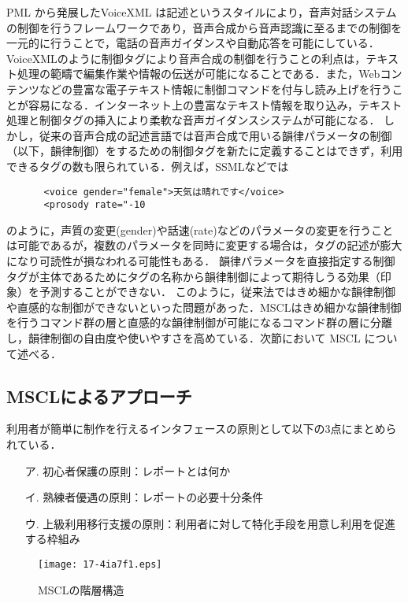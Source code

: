 \documentclass[japanese]{jnlp_1.4}
\begin{document}
PML \cite{Ramming}から発展したVoiceXML \citeauthor{VoiceXML}は記述というスタイルにより，音声対話システムの制御を行うフレームワークであり，音声合成から音声認識に至るまでの制御を一元的に行うことで，電話の音声ガイダンスや自動応答を可能にしている．VoiceXMLのように制御タグにより音声合成の制御を行うことの利点は，テキスト処理の範疇で編集作業や情報の伝送が可能になることである．また，Webコンテンツなどの豊富な電子テキスト情報に制御コマンドを付与し読み上げを行うことが容易になる．インターネット上の豊富なテキスト情報を取り込み，テキスト処理と制御タグの挿入により柔軟な音声ガイダンスシステムが可能になる．
しかし，従来の音声合成の記述言語では音声合成で用いる韻律パラメータの制御（以下，韻律制御）をするための制御タグを新たに定義することはできず，利用できるタグの数も限られている．例えば，SSMLなどでは
\begin{verbatim}
　　　　<voice gender="female">天気は晴れです</voice>
　　　　<prosody rate="-10
\end{verbatim}
のように，声質の変更(gender)や話速(rate)などのパラメータの変更を行うことは可能であるが，複数のパラメータを同時に変更する場合は，タグの記述が膨大になり可読性が損なわれる可能性もある．
韻律パラメータを直接指定する制御タグが主体であるためにタグの名称から韻律制御によって期待しうる効果（印象）を予測することができない．
このように，従来法ではきめ細かな韻律制御や直感的な制御ができないといった問題があった．MSCLはきめ細かな韻律制御を行うコマンド群の層と直感的な韻律制御が可能になるコマンド群の層に分離し，韻律制御の自由度や使いやすさを高めている．次節において MSCL について述べる．


\subsection{MSCLによるアプローチ}

利用者が簡単に制作を行えるインタフェースの原則として以下の3点\cite{Stgif}にまとめられている．
\begin{itemize}
     \item[ア.] 初心者保護の原則：レポートとは何か
     \item[イ.] 熟練者優遇の原則：レポートの必要十分条件
     \item[ウ.] 上級利用移行支援の原則：利用者に対して特化手段を用意し利用を促進する枠組み
\end{itemize}

\begin{figure}[b]
\begin{center}
\texttt{[image: 17-4ia7f1.eps]}
\end{center}
    \caption{MSCLの階層構造}
\end{figure}
\end{document}
